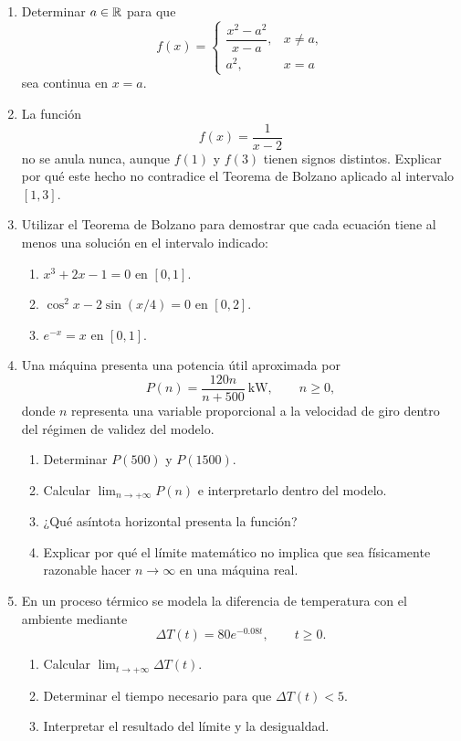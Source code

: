 \begin{enumerate}[label=\textbf{\arabic*.},leftmargin=*]
\item Determinar $a\in\mathbb{R}$ para que
\[
f(x)=
\begin{cases}
\dfrac{x^2-a^2}{x-a},&x\neq a,\\
a^2,&x=a
\end{cases}
\]
sea continua en $x=a$.

\item La función
\[
f(x)=\frac{1}{x-2}
\]
no se anula nunca, aunque $f(1)$ y $f(3)$ tienen signos distintos. Explicar por qué este hecho no contradice el Teorema de Bolzano aplicado al intervalo $[1,3]$.

\item Utilizar el Teorema de Bolzano para demostrar que cada ecuación tiene al menos una solución en el intervalo indicado:
\begin{enumerate}[label=\alph*)]
\item $x^3+2x-1=0$ en $[0,1]$.
\item $\cos^2x-2\sin(x/4)=0$ en $[0,2]$.
\item $e^{-x}=x$ en $[0,1]$.
\end{enumerate}

\item Una máquina presenta una potencia útil aproximada por
\[
P(n)=\frac{120n}{n+500}\ \mathrm{kW},\qquad n\geq0,
\]
donde $n$ representa una variable proporcional a la velocidad de giro dentro del régimen de validez del modelo.
\begin{enumerate}[label=\alph*)]
\item Determinar $P(500)$ y $P(1500)$.
\item Calcular $\displaystyle\lim_{n\to+\infty}P(n)$ e interpretarlo dentro del modelo.
\item ¿Qué asíntota horizontal presenta la función?
\item Explicar por qué el límite matemático no implica que sea físicamente razonable hacer $n\to\infty$ en una máquina real.
\end{enumerate}

\item En un proceso térmico se modela la diferencia de temperatura con el ambiente mediante
\[
\Delta T(t)=80e^{-0.08t},\qquad t\geq0.
\]
\begin{enumerate}[label=\alph*)]
\item Calcular $\displaystyle\lim_{t\to+\infty}\Delta T(t)$.
\item Determinar el tiempo necesario para que $\Delta T(t)<5$.
\item Interpretar el resultado del límite y la desigualdad.
\end{enumerate}


\end{enumerate}

